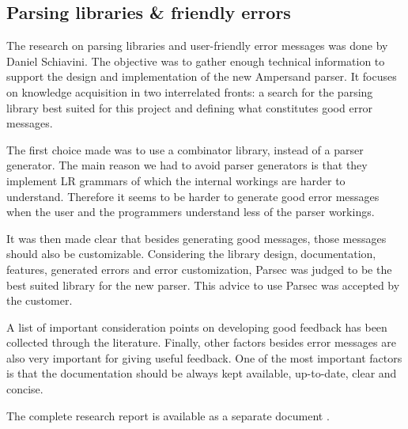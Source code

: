 

\subsection{Parsing libraries \& friendly errors}
\label{domain:parsing}
The research on parsing libraries and user-friendly error messages was done by Daniel Schiavini.
The objective was to gather enough technical information to support the design and implementation of the new Ampersand parser.
It focuses on knowledge acquisition in two interrelated fronts: a search for the parsing library best suited for this project and defining what constitutes good error messages.

The first choice made was to use a combinator library, instead of a parser generator.
The main reason we had to avoid parser generators is that they implement LR grammars of which the internal workings are harder to understand.
Therefore it seems to be harder to generate good error messages when the user and the programmers understand less of the parser workings.

It was then made clear that besides generating good messages, those messages should also be customizable.
Considering the library design, documentation, features, generated errors and error customization, Parsec was judged to be the best suited library for the new parser.
This advice to use Parsec was accepted by the customer.

A list of important consideration points on developing good feedback has been collected through the literature.
Finally, other factors besides error messages are also very important for giving useful feedback.
One of the most important factors is that the documentation should be always kept available, up-to-date, clear and concise.

The complete research report is available as a separate document .
